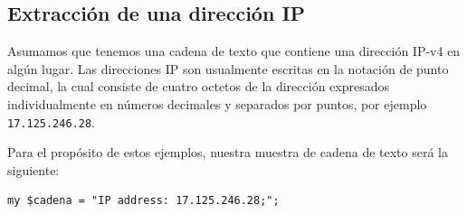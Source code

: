 \subsection{Extracción de una dirección IP}

Asumamos que tenemos una cadena de texto que contiene
una dirección IP-v4 en algún lugar. Las direcciones IP
son usualmente escritas en la notación de punto decimal,
la cual consiste de cuatro octetos de la dirección expresados
individualmente en números decimales y separados por puntos,
por ejemplo {\tt 17.125.246.28}.

Para el propósito de estos ejemplos, nuestra muestra de
cadena de texto será la siguiente:

\begin{lstlisting}
my $cadena = "IP address: 17.125.246.28;";
\end{lstlisting}
%


